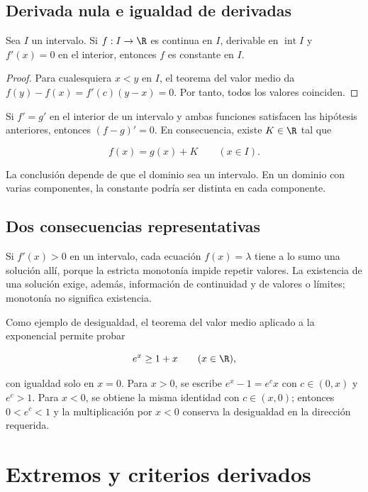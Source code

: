 \subsection{Derivada nula e igualdad de derivadas}

\begin{corolario}
Sea \(I\) un intervalo. Si \(f:I\to\R\) es continua en \(I\), derivable en
\(\operatorname{int}I\) y \(f'(x)=0\) en el interior, entonces \(f\) es
constante en \(I\).
\end{corolario}

\begin{proof}
Para cualesquiera \(x<y\) en \(I\), el teorema del valor medio da
\(f(y)-f(x)=f'(c)(y-x)=0\). Por tanto, todos los valores coinciden.
\end{proof}

Si \(f'=g'\) en el interior de un intervalo y ambas funciones satisfacen las
hipótesis anteriores, entonces \((f-g)'=0\). En consecuencia, existe
\(K\in\R\) tal que

\[
  f(x)=g(x)+K
  \qquad(x\in I).
\]

La conclusión depende de que el dominio sea un intervalo. En un dominio con
varias componentes, la constante podría ser distinta en cada componente.

\subsection{Dos consecuencias representativas}

Si \(f'(x)>0\) en un intervalo, cada ecuación \(f(x)=\lambda\) tiene a lo sumo
una solución allí, porque la estricta monotonía impide repetir valores. La
existencia de una solución exige, además, información de continuidad y de
valores o límites; monotonía no significa existencia.

Como ejemplo de desigualdad, el teorema del valor medio aplicado a la
exponencial permite probar

\[
  e^x\ge 1+x \qquad(x\in\R),
\]

con igualdad solo en \(x=0\). Para \(x>0\), se escribe
\(e^x-1=e^c x\) con \(c\in(0,x)\) y \(e^c>1\). Para \(x<0\), se obtiene la
misma identidad con \(c\in(x,0)\); entonces \(0<e^c<1\) y la multiplicación
por \(x<0\) conserva la desigualdad en la dirección requerida.

\section{Extremos y criterios derivados}
\label{sec:extremos-criterios}

